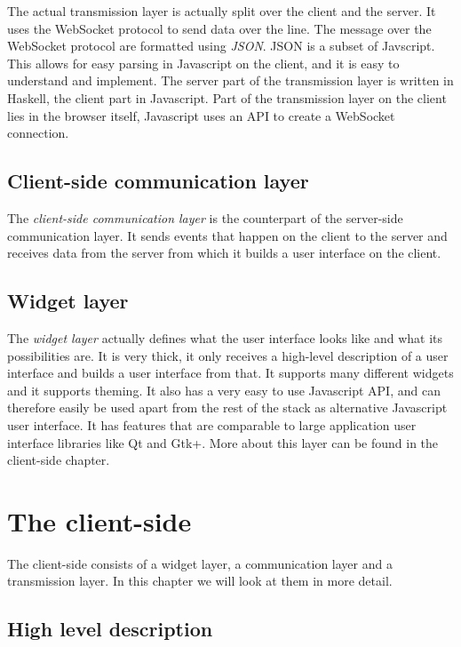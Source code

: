 \documentclass[11pt]{article}
\begin{document}
The actual transmission layer is actually split over the client and the server.
It uses the WebSocket protocol to send data over the line.
The message over the WebSocket protocol are formatted using \textit{JSON}.
JSON is a subset of Javscript.
This allows for easy parsing in Javascript on the client, and it is easy to understand and implement.
The server part of the transmission layer is written in Haskell, the client part in Javascript.
Part of the transmission layer on the client lies in the browser itself, Javascript uses an API to create a WebSocket connection.

\subsection{Client-side communication layer}

The \textit{client-side communication layer} is the counterpart of the server-side communication layer.
It sends events that happen on the client to the server and receives data from the server from which it builds a user interface on the client.

\subsection{Widget layer}

The \textit{widget layer} actually defines what the user interface looks like and what its possibilities are.
It is very thick, it only receives a high-level description of a user interface and builds a user interface from that.
It supports many different widgets and it supports theming.
It also has a very easy to use Javascript API, and can therefore easily be used apart from the rest of the stack as alternative Javascript user interface.
It has features that are comparable to large application user interface libraries like Qt and Gtk+.
More about this layer can be found in the client-side chapter.

\newpage
\section{The client-side}

The client-side consists of a widget layer, a communication layer and a transmission layer.
In this chapter we will look at them in more detail.

\subsection{High level description}
\end{document}
